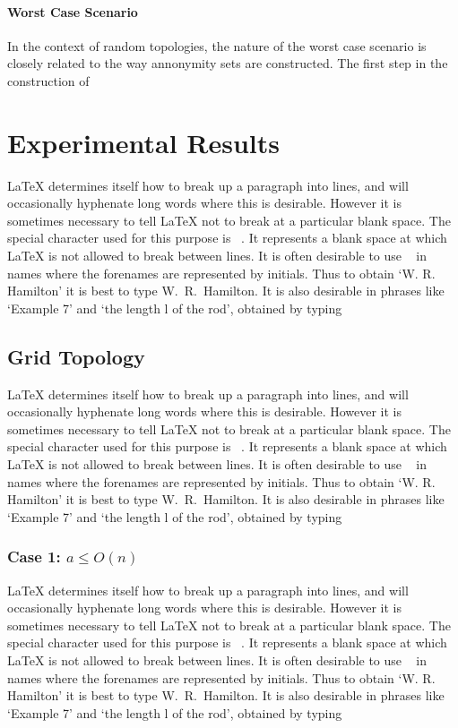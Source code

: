 \documentclass[12pt]{report}
\begin{document}
\subsubsection{Worst Case Scenario}

In the context of random topologies, the nature of the worst case scenario is closely related to the way annonymity sets are constructed. The first step in the construction of 



\chapter{Experimental Results}

LaTeX determines itself how to break up a paragraph into lines, and will occasionally hyphenate long words where this is desirable. However it is sometimes necessary to tell LaTeX not to break at a particular blank space. The special character used for this purpose is ~. It represents a blank space at which LaTeX is not allowed to break between lines. It is often desirable to use ~ in names where the forenames are represented by initials. Thus to obtain `W. R. Hamilton' it is best to type W.~R.~Hamilton. It is also desirable in phrases like `Example 7' and `the length l of the rod', obtained by typing



\section{Grid Topology}

LaTeX determines itself how to break up a paragraph into lines, and will occasionally hyphenate long words where this is desirable. However it is sometimes necessary to tell LaTeX not to break at a particular blank space. The special character used for this purpose is ~. It represents a blank space at which LaTeX is not allowed to break between lines. It is often desirable to use ~ in names where the forenames are represented by initials. Thus to obtain `W. R. Hamilton' it is best to type W.~R.~Hamilton. It is also desirable in phrases like `Example 7' and `the length l of the rod', obtained by typing



\subsection{Case 1: $a \le O(n)$}

LaTeX determines itself how to break up a paragraph into lines, and will occasionally hyphenate long words where this is desirable. However it is sometimes necessary to tell LaTeX not to break at a particular blank space. The special character used for this purpose is ~. It represents a blank space at which LaTeX is not allowed to break between lines. It is often desirable to use ~ in names where the forenames are represented by initials. Thus to obtain `W. R. Hamilton' it is best to type W.~R.~Hamilton. It is also desirable in phrases like `Example 7' and `the length l of the rod', obtained by typing
\end{document}
